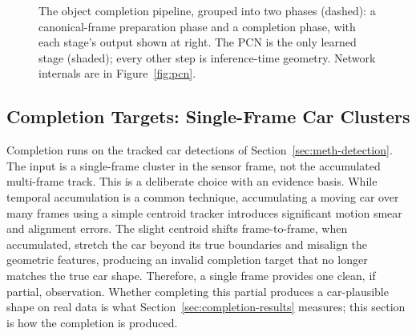 \begin{figure}[H]
  \caption[Object completion pipeline]{The object completion pipeline, grouped into two
    phases (dashed): a canonical-frame preparation phase and a completion phase, with each
    stage's output shown at right. The PCN is the only learned stage (shaded); every other
    step is inference-time geometry. Network internals are in Figure~\ref{fig:pcn}.}
  \label{fig:completion-pipeline}
\end{figure}

\subsection{Completion Targets: Single-Frame Car Clusters}
\label{sec:completion-what}

Completion runs on the tracked car detections of Section~\ref{sec:meth-detection}. The input is a
single-frame cluster in the sensor frame, not the accumulated multi-frame
track. This is a deliberate choice with an evidence basis. While temporal accumulation is a common
technique, accumulating a moving car over many frames using a simple centroid tracker
introduces significant motion smear and alignment errors. The slight centroid shifts
frame-to-frame, when accumulated, stretch the car beyond its true boundaries and misalign
the geometric features, producing an invalid completion target that no longer matches the
true car shape. Therefore, a single frame provides one clean, if partial,
observation. Whether completing this partial produces a car-plausible shape on real data
is what Section~\ref{sec:completion-results} measures; this section is how the completion
is produced.

